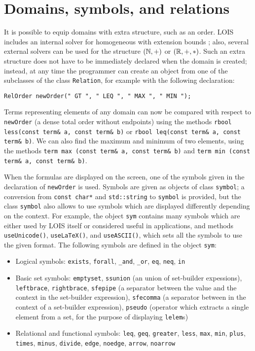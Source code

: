 \section{Domains, symbols, and relations}\label{sec:relations}

It is possible to equip domains with extra structure, such as an order. LOIS includes
an internal solver for homogeneous with extension bounds \cite{lois-sat}; also,
several external solvers can be used for the structure $({\mathbb N}, +)$ or $({\mathbb R}, +, *)$.
Such an extra
structure does not have to be immediately declared when the domain is created; instead,
at any time the programmer can create an object from one of the subclasses of the class
{\tt Relation}, for example with the following declaration:

\begin{lstlisting}
RelOrder newOrder(" GT ", " LEQ ", " MAX ", " MIN ");
\end{lstlisting}

Terms representing elements of any domain can now be compared with respect to
{\tt newOrder} (a dense total order without endpoints) using the methods {\tt rbool less(const term\& a, const term\& b)} or
{\tt rbool leq(const term\& a, const term\& b)}. We can also find the maximum and minimum
of two elements, using the methods {\tt term max (const term\& a, const term\& b)}
and {\tt term min (const term\& a, const term\& b)}.

When the formulas are displayed on the screen, one of the symbols given in the
declaration of {\tt newOrder} is used. Symbols are given as objects of class
{\tt symbol}; a conversion from {\tt const char*} and {\tt std::string} to {\tt symbol}
is provided, but the class {\tt symbol} also allows to use symbols which are displayed
differently depending on the context. For example, the object {\tt sym} contains 
many symbols which are either used by LOIS itself or considered useful in applications,
and methods {\tt useUnicode()}, {\tt useLaTeX()},
and {\tt useASCII()}, which sets all the symbols to use the given format. The following
symbols are defined in the object {\tt sym}:

\begin{itemize}
\item Logical symbols:
{\tt exists}, {\tt forall}, {\tt \_and}, {\tt \_or}, {\tt eq}, {\tt neq}, {\tt in}

\item Basic set symbols:
{\tt emptyset}, {\tt ssunion} (an union of set-builder expessions), 
{\tt leftbrace}, {\tt rightbrace}, {\tt sfepipe} (a separator between the value
and the context in the set-builder expression), {\tt sfecomma} (a separator between
in the context of a set-builder expression), {\tt pseudo} (operator which extracts
a single element from a set, for the purpose of displaying {\tt lelem}s)

\item Relational and functional symbols:
{\tt leq}, {\tt geq}, {\tt greater}, {\tt less}, {\tt max}, {\tt min},
{\tt plus}, {\tt times}, {\tt minus}, {\tt divide}, {\tt edge}, {\tt noedge},
{\tt arrow}, {\tt noarrow}
\end{itemize}

